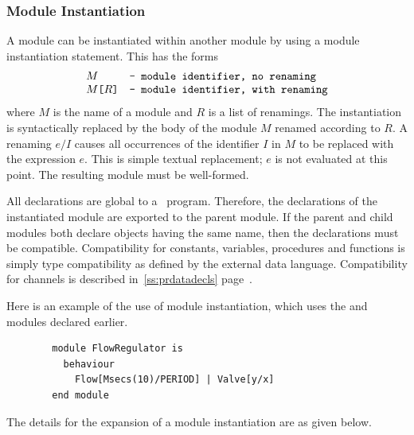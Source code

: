 \subsubsection{Module Instantiation\label{ss:prmodinst}}
A module can be instantiated within another module by using a module 
instantiation statement. This has the forms
\[
\begin{array}{ll}
M & \mbox{\tt -- module identifier, no renaming} \\
M \mbox{\tt [}R\mbox{\tt ]}  & \mbox{\tt -- module identifier, with renaming}
\end{array}
\]
where $M$ is the name of a module and $R$ is a list of 
renamings. The instantiation is syntactically replaced by the body
of the module $M$ renamed according to $R$. A renaming
$e / I$ causes all occurrences of the identifier $I$ in 
$M$ to be replaced with the expression $e$. This is
simple textual replacement; $e$ is not evaluated at this point.
The resulting module must be well-formed. 

All declarations are global to a \candle\ program. Therefore, the
declarations of the instantiated module are exported to the parent
module. If the parent and child modules both declare objects having the
same name, then the declarations must be compatible. Compatibility
for constants, variables, procedures and functions is simply
type compatibility as defined by the external data language. Compatibility
for channels is described in~\Sec\ref{ss:prdatadecls} 
page~\pageref{page:prchannelcompat}. 

Here is an example of the use of module instantiation, which uses the
 and  modules declared earlier.  
\begin{verbatim}
        module FlowRegulator is
          behaviour
            Flow[Msecs(10)/PERIOD] | Valve[y/x]    
        end module
\end{verbatim}
The details for the expansion of a module instantiation
are as given below.

